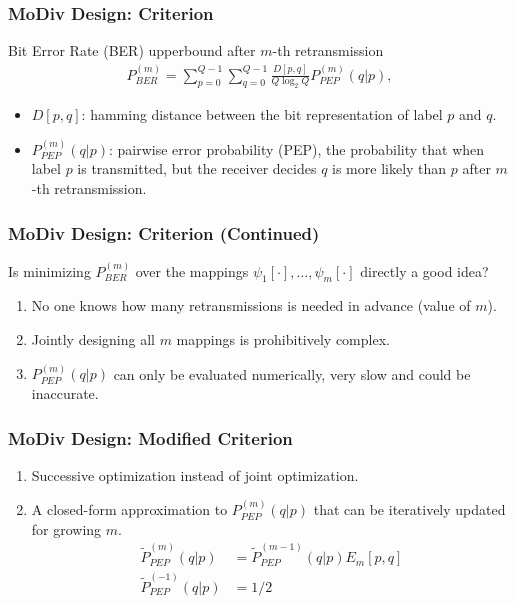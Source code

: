 \documentclass{beamer}
\begin{document}
\begin{frame}
  \frametitle{MoDiv Design: Criterion}
  \begin{block}{Bit Error Rate (BER) upperbound after $m$-th retransmission}
    \begin{align*}
      P_{BER}^{(m)} = \sum_{p=0}^{Q - 1}\sum_{q=0}^{Q - 1}\frac{D[p,
      q]}{Q\log_2Q}P_{PEP}^{(m)}(q|p), \label{eq:P_BER}
    \end{align*}
  \end{block}
  \begin{itemize}
    \item $D[p,q]$: hamming distance between the bit representation of label $p$
    and $q$.
    \item $P_{PEP}^{(m)}(q|p)$: pairwise error probability (PEP), the
    probability that when label $p$ is transmitted, but the receiver decides $q$
    is more likely than $p$ after $m$-th retransmission.
  \end{itemize}
\end{frame}

\begin{frame}
  \frametitle{MoDiv Design: Criterion (Continued)}
  Is minimizing $P_{BER}^{(m)}$ over the mappings $\psi_1[\cdot],\ldots,
  \psi_m[\cdot]$ directly a good idea?
  \begin{enumerate}
    \item No one knows how many retransmissions is needed in advance (value
    of $m$).
    \item Jointly designing all $m$ mappings is prohibitively complex.
    \item $P_{PEP}^{(m)}(q|p)$ can only be evaluated numerically, very slow and
    could be inaccurate.
  \end{enumerate}
\end{frame}

\begin{frame}
  \frametitle{MoDiv Design: Modified Criterion}
  \begin{enumerate}
    \item<1-> Successive optimization instead of joint optimization.
    \item<3> A closed-form approximation to $P_{PEP}^{(m)}(q|p)$ that can be
    iteratively updated for growing $m$.
    \begin{align*}
      \tilde{P}_{PEP}^{(m)}(q|p) &= \tilde{P}_{PEP}^{(m -
      1)}(q|p)E_m[p,q] \\
      \tilde{P}_{PEP}^{(-1)}(q|p) &= 1 / 2
    \end{align*}
  \end{enumerate}
\end{frame}
\end{document}
